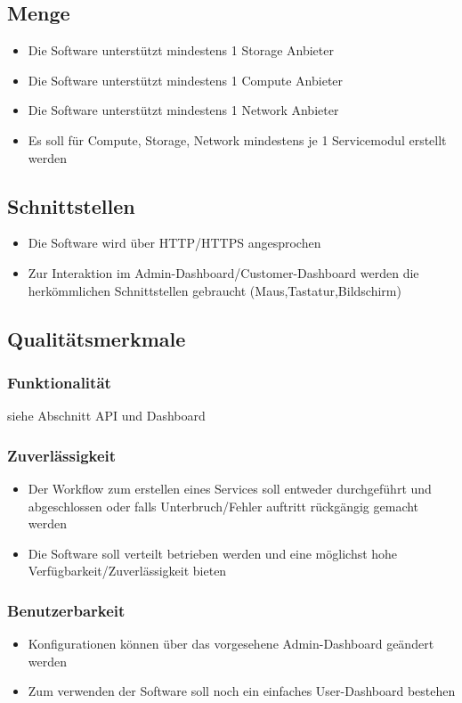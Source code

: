 \subsection{Menge}
\begin{itemize}
  \item Die Software unterstützt mindestens 1 Storage Anbieter
  \item Die Software unterstützt mindestens 1 Compute Anbieter
  \item Die Software unterstützt mindestens 1 Network Anbieter
  \item Es soll für Compute, Storage, Network mindestens je 1 Servicemodul erstellt 
  werden
\end{itemize}

\subsection{Schnittstellen}
\begin{itemize}
  \item Die Software wird über HTTP/HTTPS angesprochen
  \item Zur Interaktion im Admin-Dashboard/Customer-Dashboard werden die herkömmlichen 
  Schnittstellen gebraucht (Maus,Tastatur,Bildschirm)
\end{itemize}
\subsection{Qualitätsmerkmale}
\subsubsection{Funktionalität}
siehe Abschnitt API und Dashboard
\subsubsection{Zuverlässigkeit}
\begin{itemize}
  \item Der Workflow zum erstellen eines Services soll entweder durchgeführt und 
  abgeschlossen oder falls Unterbruch/Fehler auftritt rückgängig gemacht werden
  \item Die Software soll verteilt betrieben werden und eine möglichst hohe 
  Verfügbarkeit/Zuverlässigkeit bieten
\end{itemize}
\subsubsection{Benutzerbarkeit}
\begin{itemize}
  \item Konfigurationen können über das vorgesehene Admin-Dashboard geändert werden
  \item Zum verwenden der Software soll noch ein einfaches 
  User-Dashboard bestehen
\end{itemize}
